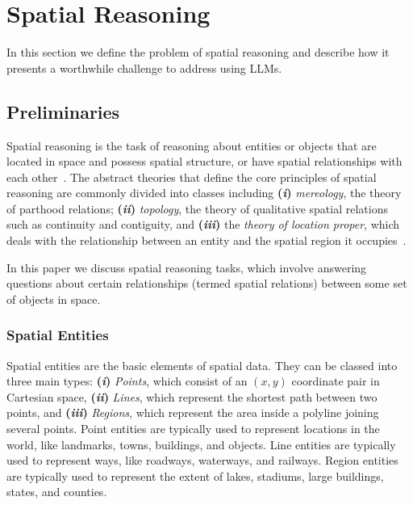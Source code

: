 \section{Spatial Reasoning}
\label{section:background}

In this section we define the problem of spatial reasoning and describe how it presents a worthwhile challenge to address using LLMs.

\subsection{Preliminaries}
Spatial reasoning is the task of reasoning about entities or objects that are located in space and possess spatial structure, or have spatial relationships with each other~\cite{Varzi2007}.
The abstract theories that define the core principles of spatial reasoning are commonly divided into classes including 
\textbf{(\textit{i})} \textit{mereology}, the theory of parthood relations;
\textbf{(\textit{ii})} \textit{topology}, the theory of qualitative spatial relations such as continuity and contiguity, and 
\textbf{(\textit{iii})} the \textit{theory of location proper}, which deals with the relationship between an entity and the spatial region it
occupies~\cite{Varzi2007}.

In this paper we discuss spatial reasoning tasks, which involve answering questions about certain relationships (termed spatial relations) between some set of objects in space.



\subsubsection{Spatial Entities}
Spatial entities are the basic elements of spatial data.
They can be classed into three main types: \textbf{(\textit{i})} \textit{Points}, which consist of an $(x,y)$ coordinate pair in Cartesian space, \textbf{(\textit{ii})} \textit{Lines}, which represent the shortest path between two points, and \textbf{(\textit{iii})} \textit{Regions}, which represent the area inside a polyline joining several points. 
Point entities are typically used to represent locations in the world, like landmarks, towns, buildings, and objects.
Line entities are typically used to represent ways, like roadways, waterways, and railways.
Region entities are typically used to represent the extent of lakes, stadiums, large buildings, states, and counties.


